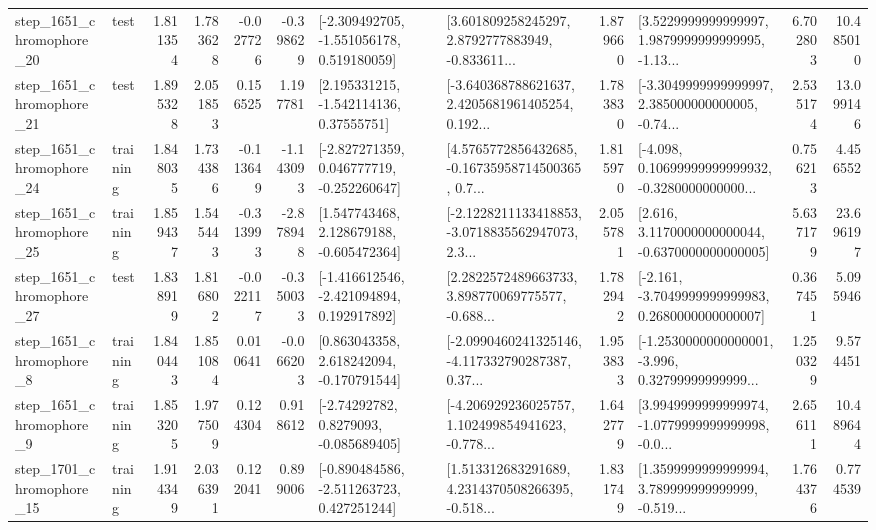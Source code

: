 \begin{tabular}{llrrrrllrlrr}
 step\_1651\_chromophore\_20 &      test &      1.811354 &    1.783628 &     -0.027726 & -0.398629 &   [-2.309492705, -1.551056178, 0.519180059] &  [3.601809258245297, 2.8792777883949, -0.833611... &       1.879660 &  [3.5229999999999997, 1.9879999999999995, -1.13... &            6.702803 &         10.485010 \\
 step\_1651\_chromophore\_21 &      test &      1.895328 &    2.051853 &      0.156525 &  1.197781 &     [2.195331215, -1.542114136, 0.37555751] &  [-3.640368788621637, 2.4205681961405254, 0.192... &       1.783830 &  [-3.3049999999999997, 2.385000000000005, -0.74... &            2.535174 &         13.099146 \\
 step\_1651\_chromophore\_24 &  training &      1.848035 &    1.734386 &     -0.113649 & -1.143093 &   [-2.827271359, 0.046777719, -0.252260647] &  [4.5765772856432685, -0.16735958714500365, 0.7... &       1.815970 &  [-4.098, 0.10699999999999932, -0.3280000000000... &            0.756213 &          4.456552 \\
 step\_1651\_chromophore\_25 &  training &      1.859437 &    1.545443 &     -0.313993 & -2.878948 &    [1.547743468, 2.128679188, -0.605472364] &  [-2.1228211133418853, -3.0718835562947073, 2.3... &       2.055781 &   [2.616, 3.1170000000000044, -0.6370000000000005] &            5.637179 &         23.696197 \\
 step\_1651\_chromophore\_27 &      test &      1.838919 &    1.816802 &     -0.022117 & -0.350033 &   [-1.416612546, -2.421094894, 0.192917892] &  [2.2822572489663733, 3.898770069775577, -0.688... &       1.782942 &  [-2.161, -3.7049999999999983, 0.2680000000000007] &            0.367451 &          5.095946 \\
  step\_1651\_chromophore\_8 &  training &      1.840443 &    1.851084 &      0.010641 & -0.066203 &    [0.863043358, 2.618242094, -0.170791544] &  [-2.0990460241325146, -4.117332790287387, 0.37... &       1.953833 &  [-1.2530000000000001, -3.996, 0.32799999999999... &            1.250329 &          9.574451 \\
  step\_1651\_chromophore\_9 &  training &      1.853205 &    1.977509 &      0.124304 &  0.918612 &      [-2.74292782, 0.8279093, -0.085689405] &  [-4.206929236025757, 1.102499854941623, -0.778... &       1.642779 &  [3.9949999999999974, -1.0779999999999998, -0.0... &            2.656111 &         10.489644 \\
 step\_1701\_chromophore\_15 &  training &      1.914349 &    2.036391 &      0.122041 &  0.899006 &   [-0.890484586, -2.511263723, 0.427251244] &  [1.513312683291689, 4.2314370508266395, -0.518... &       1.831749 &  [1.3599999999999994, 3.789999999999999, -0.519... &            1.764376 &          0.774539 \\

\end{tabular}
